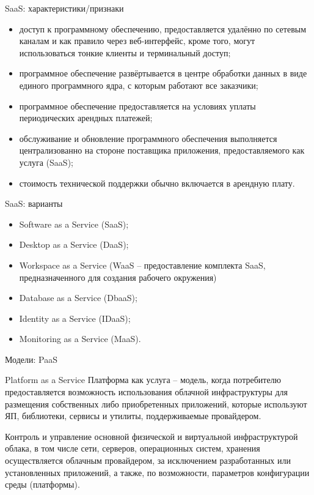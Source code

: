 \begin{frame}{SaaS: характеристики/признаки}
	\begin{itemize}
		\item доступ к программному обеспечению, предоставляется удалённо по сетевым каналам и как правило через веб-интерфейс,  кроме того,  могут использоваться тонкие клиенты и терминальный доступ;
		\item программное обеспечение развёртывается в центре обработки данных в виде единого программного ядра,  с которым работают все заказчики;
		\item программное обеспечение предоставляется на условиях уплаты периодических арендных платежей;
		\item обслуживание и обновление программного обеспечения выполняется централизованно на стороне поставщика приложения,  предоставляемого как услуга (SaaS);
		\item стоимость технической поддержки обычно включается в арендную плату.
	\end{itemize}
\end{frame}

\begin{frame}{SaaS: варианты}
	\begin{itemize}
		\item Software as a Service (SaaS);
		\item Desktop as a Service (DaaS);
		\item Workspace as a Service (WaaS -- предоставление комплекта  SaaS, предназначенного для создания рабочего окружения)
		\item Database as a Service (DbaaS);
		\item Identity as a Service (IDaaS);
		\item Monitoring as a Service (MaaS).
	\end{itemize}

\end{frame}

\begin{frame}{Модели: PaaS}
	\begin{block}{Platform as a Service}
		Платформа как услуга -- модель,  когда потребителю предоставляется возможность использования облачной инфраструктуры для размещения собственных либо приобретенных приложений, которые используют ЯП, библиотеки, сервисы и утилиты, поддерживаемые провайдером.

		\bigskip
Контроль и управление основной физической и виртуальной инфраструктурой облака,  в том числе сети,  серверов,  операционных систем,  хранения осуществляется облачным провайдером,  за исключением разработанных или установленных приложений,  а также,  по возможности,  параметров конфигурации среды (платформы).
	\end{block}
\end{frame}

